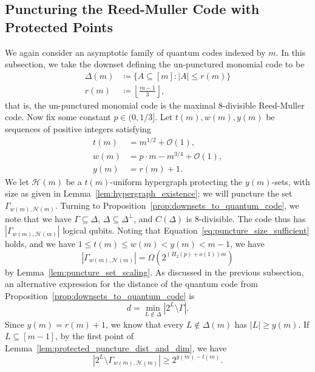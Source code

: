 \documentclass{article}
\begin{document}
\subsection{Puncturing the Reed-Muller Code with Protected Points}\label{subsec:rm_protect}

We again consider an asymptotic family of quantum codes indexed by $m$. In this subsection, we take the downset defining the un-punctured monomial code to be
\begin{align}
    \Delta(m) &\coloneq \{A \subseteq [m] : |A| \leq r(m)\}\\
    r(m) &\coloneq \left\lfloor \frac{m-1}{3}\right\rfloor,
\end{align}
that is, the un-punctured monomial code is the maximal $8$-divisible Reed-Muller code. Now fix some constant $p \in (0,1/3]$. Let $t(m), w(m), y(m)$ be sequences of positive integers satisfying
\begin{align}
    t(m) &= m^{1/2} + \mathcal{O}(1),\\
    w(m) &= p\cdot m - m^{3/4} + \mathcal{O}(1),\\
    y(m) &= r(m) + 1.
\end{align}
We let $\mathcal{H}(m)$ be a $t(m)$-uniform hypergraph protecting the $y(m)$-sets, with size as given in Lemma~\ref{lem:hypergraph_existence}; we will puncture the set $\Gamma_{w(m), \mathcal{H}(m)}$. Turning to Proposition~\ref{prop:downsets_to_quantum_code}, we note that we have $\Gamma \subseteq \Delta$, $\Delta \subseteq \Delta^\perp$, and $C(\Delta)$ is $8$-divisible. The code thus has $|\Gamma_{w(m),\mathcal{H}(m)}|$ logical qubits. Noting that Equation~\eqref{eq:puncture_size_sufficient} holds, and we have $1 \leq t(m) \leq w(m) < y(m) < m-1$, we have
\begin{equation}
    |\Gamma_{w(m), \mathcal{H}(m)}| = \Omega\left(2^{(H_2(p)+o(1))m}\right)
\end{equation}
by Lemma~\ref{lem:puncture_set_scaling}. As discussed in the previous subsection, an alternative expression for the distance of the quantum code from Proposition~\ref{prop:downsets_to_quantum_code} is
\begin{equation}
    d = \min_{L \notin\Delta}\left|2^L\setminus \Gamma\right|.
\end{equation}
Since $y(m) = r(m)+1$, we know that every $L \notin\Delta(m)$ has $|L|\geq y(m)$. If $L \subseteq [m-1]$, by the first point of Lemma~\ref{lem:protected_puncture_dist_and_dim}, we have
\begin{equation}
    \left|2^L\setminus\Gamma_{w(m), \mathcal{H}(m)}\right| \geq 2^{y(m)-t(m)}.
\end{equation}
\end{document}
